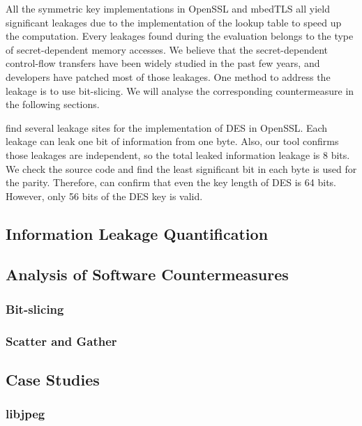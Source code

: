 All the symmetric key implementations in OpenSSL and mbedTLS all yield
significant leakages due to the implementation of the lookup table
to speed up the computation. Every leakages found during the evaluation
belongs to the type of secret-dependent memory accesses. We believe that
the secret-dependent control-flow transfers have been widely studied in
the past few years, and developers have patched most of those leakages. 
One method to address the leakage is to use bit-slicing. We will analyse
the corresponding countermeasure in the following sections.

\tool{} find several leakage sites for the implementation of DES in OpenSSL.
Each leakage can leak one bit of information from one byte. Also, our tool
confirms those leakages are independent, so the total leaked information leakage
is 8 bits. We check the source code and find the least significant
bit in each byte is used for the parity. Therefore, \tool{} can confirm
that even the key length of DES is 64 bits. However, only 56 bits of the 
DES key is valid. 



\subsection{Information Leakage Quantification}
\subsection{Analysis of Software Countermeasures}
\subsubsection{Bit-slicing}
\subsubsection{Scatter and Gather}
\subsection{Case Studies}
\subsubsection{libjpeg}

